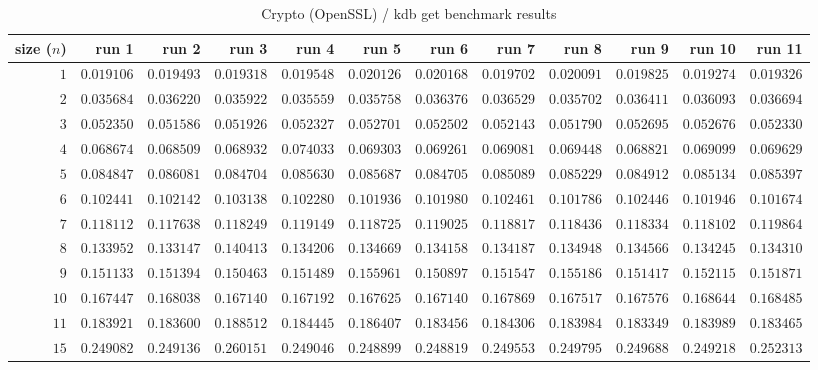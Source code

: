  
\begin{sidewaystable} \centering \caption{Crypto (OpenSSL) / kdb get benchmark results} \label{eval-table-openssl-get} \scriptsize \begin{tabular}{r|rrrrrrrrrrr} size ($n$) & run 1 & run 2 & run 3 & run 4 & run 5 & run 6 & run 7 & run 8 & run 9 & run 10 & run 11\\ \hline
$1$ & $0.019106$ & $0.019493$ & $0.019318$ & $0.019548$ & $0.020126$ & $0.020168$ & $0.019702$ & $0.020091$ & $0.019825$ & $0.019274$ & $0.019326$ \\
$2$ & $0.035684$ & $0.036220$ & $0.035922$ & $0.035559$ & $0.035758$ & $0.036376$ & $0.036529$ & $0.035702$ & $0.036411$ & $0.036093$ & $0.036694$ \\
$3$ & $0.052350$ & $0.051586$ & $0.051926$ & $0.052327$ & $0.052701$ & $0.052502$ & $0.052143$ & $0.051790$ & $0.052695$ & $0.052676$ & $0.052330$ \\
$4$ & $0.068674$ & $0.068509$ & $0.068932$ & $0.074033$ & $0.069303$ & $0.069261$ & $0.069081$ & $0.069448$ & $0.068821$ & $0.069099$ & $0.069629$ \\
$5$ & $0.084847$ & $0.086081$ & $0.084704$ & $0.085630$ & $0.085687$ & $0.084705$ & $0.085089$ & $0.085229$ & $0.084912$ & $0.085134$ & $0.085397$ \\
$6$ & $0.102441$ & $0.102142$ & $0.103138$ & $0.102280$ & $0.101936$ & $0.101980$ & $0.102461$ & $0.101786$ & $0.102446$ & $0.101946$ & $0.101674$ \\
$7$ & $0.118112$ & $0.117638$ & $0.118249$ & $0.119149$ & $0.118725$ & $0.119025$ & $0.118817$ & $0.118436$ & $0.118334$ & $0.118102$ & $0.119864$ \\
$8$ & $0.133952$ & $0.133147$ & $0.140413$ & $0.134206$ & $0.134669$ & $0.134158$ & $0.134187$ & $0.134948$ & $0.134566$ & $0.134245$ & $0.134310$ \\
$9$ & $0.151133$ & $0.151394$ & $0.150463$ & $0.151489$ & $0.155961$ & $0.150897$ & $0.151547$ & $0.155186$ & $0.151417$ & $0.152115$ & $0.151871$ \\
$10$ & $0.167447$ & $0.168038$ & $0.167140$ & $0.167192$ & $0.167625$ & $0.167140$ & $0.167869$ & $0.167517$ & $0.167576$ & $0.168644$ & $0.168485$ \\
$11$ & $0.183921$ & $0.183600$ & $0.188512$ & $0.184445$ & $0.186407$ & $0.183456$ & $0.184306$ & $0.183984$ & $0.183349$ & $0.183989$ & $0.183465$ \\
$15$ & $0.249082$ & $0.249136$ & $0.260151$ & $0.249046$ & $0.248899$ & $0.248819$ & $0.249553$ & $0.249795$ & $0.249688$ & $0.249218$ & $0.252313$ \\

\end{tabular}
\end{sidewaystable}
